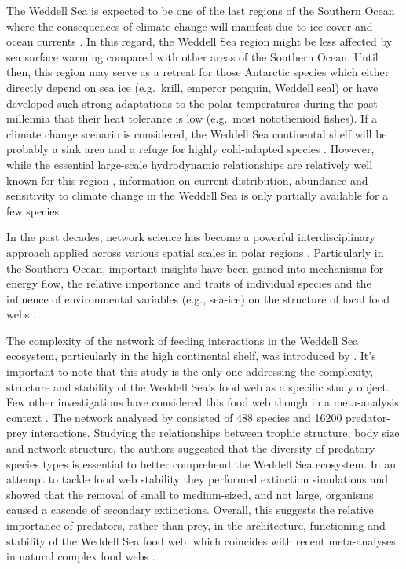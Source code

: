 \documentclass[gc, manuscript]{copernicus}
\begin{document}
The Weddell Sea is expected to be one of the last regions of the
Southern Ocean where the consequences of climate change will manifest
due to ice cover and ocean currents \citep{Teschke2021}. In this regard,
the Weddell Sea region might be less affected by sea surface warming
compared with other areas of the Southern Ocean. Until then, this region
may serve as a retreat for those Antarctic species which either directly
depend on sea ice (e.g.~krill, emperor penguin, Weddell seal) or have
developed such strong adaptations to the polar temperatures during the
past millennia that their heat tolerance is low (e.g.~most notothenioid
fishes). If a climate change scenario is considered, the Weddell Sea
continental shelf will be probably a sink area and a refuge for highly
cold-adapted species \citep{Griffiths2017}. However, while the essential
large-scale hydrodynamic relationships are relatively well known for
this region \citep{deSteur2019}, information on current distribution,
abundance and sensitivity to climate change in the Weddell Sea is only
partially available for a few species \citep{Houstin2022}.

In the past decades, network science has become a powerful
interdisciplinary approach applied across various spatial scales in
polar regions \citep{Carscallen2012, Santana2013}. Particularly in the
Southern Ocean, important insights have been gained into mechanisms for
energy flow, the relative importance and traits of individual species
and the influence of environmental variables (e.g., sea-ice) on the
structure of local food webs \citep{Cordone2020, Rossi2019}.

The complexity of the network of feeding interactions in the Weddell Sea
ecosystem, particularly in the high continental shelf, was introduced by
\citet{Jacob2011}. It's important to note that this study is the only
one addressing the complexity, structure and stability of the Weddell
Sea's food web as a specific study object. Few other investigations have
considered this food web though in a meta-analysis context
\citep{Brose2019, Perkins2022, Saravia2022}. The network analysed by
\citet{Jacob2011} consisted of 488 species and 16200 predator-prey
interactions. Studying the relationships between trophic structure, body
size and network structure, the authors suggested that the diversity of
predatory species types is essential to better comprehend the Weddell
Sea ecosystem. In an attempt to tackle food web stability they performed
extinction simulations and showed that the removal of small to
medium-sized, and not large, organisms caused a cascade of secondary
extinctions. Overall, this suggests the relative importance of
predators, rather than prey, in the architecture, functioning and
stability of the Weddell Sea food web, which coincides with recent
meta-analyses in natural complex food webs
\citep{Brose2019, Perkins2022}.
\end{document}
